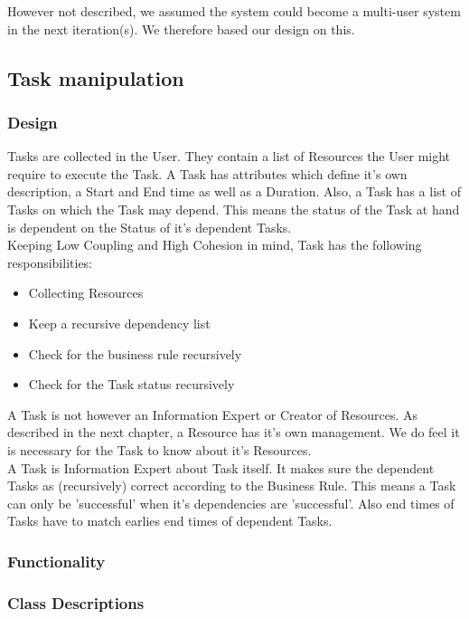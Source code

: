 		However not described, we assumed the system could become a multi-user system in the next iteration(s). We therefore based our design on this.
		\subsection{Task manipulation}
			\subsubsection{Design}
			Tasks are collected in the User. They contain a list of Resources the User might require to execute the Task.
			A Task has attributes which define it's own description, a Start and End time as well as a Duration.
			Also, a Task has a list of Tasks on which the Task may depend. This means the status of the Task at hand is dependent on the Status of it's dependent Tasks.\\
			Keeping Low Coupling and High Cohesion in mind, Task has the following responsibilities:
			\begin{itemize}
				\item{Collecting Resources}
				\item{Keep a recursive dependency list}
				\item{Check for the business rule recursively}
				\item{Check for the Task status recursively}
			\end{itemize}
			A Task is not however an Information Expert or Creator of Resources. As described in the next chapter, a Resource has it's own management.
			We do feel it is necessary for the Task to know about it's Resources.\\
			A Task is Information Expert about Task itself. It makes sure the dependent Tasks as (recursively) correct according to the Business Rule. This means a Task can only be 'successful' when it's dependencies are 'successful'. Also end times of Tasks have to match earlies end times of dependent Tasks.			
			\subsubsection{Functionality}
			
			\subsubsection{Class Descriptions}
			
